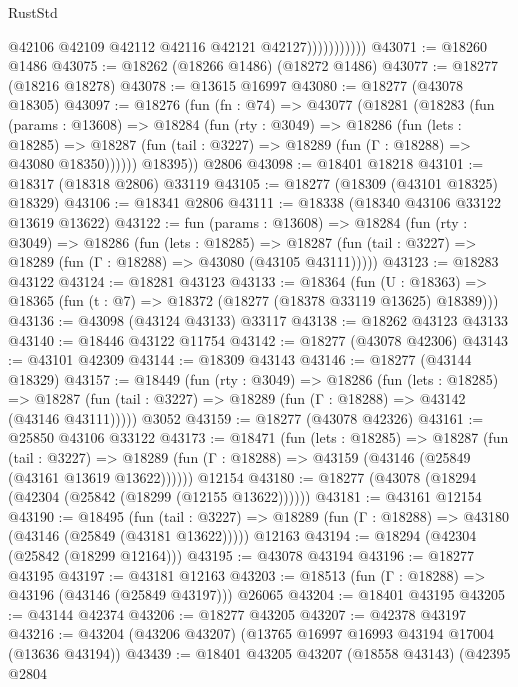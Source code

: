 \begin{lexlean}{RustStd}
\begin{coremodule}
                          @42106
                          @42109
                          @42112
                          @42116
                          @42121
                          @42127)))))))))))
@43071 := @18260 @1486
@43075 := @18262 (@18266 @1486) (@18272 @1486)
@43077 := @18277 (@18216 @18278)
@43078 := @13615 @16997
@43080 := @18277 (@43078 @18305)
@43097 := @18276
    (fun (fn : @74) =>
    @43077
      (@18281
        (@18283
          (fun (params : @13608) =>
          @18284
            (fun (rty : @3049) =>
            @18286
              (fun (lets : @18285) =>
              @18287 (fun (tail : @3227) => @18289 (fun (Γ : @18288) => @43080 @18350))))))
        @18395))
    @2806
@43098 := @18401 @18218
@43101 := @18317 (@18318 @2806) @33119
@43105 := @18277 (@18309 (@43101 @18325) @18329)
@43106 := @18341 @2806
@43111 := @18338 (@18340 @43106 @33122 @13619 @13622)
@43122 := fun (params : @13608) =>
  @18284
    (fun (rty : @3049) =>
    @18286
      (fun (lets : @18285) =>
      @18287 (fun (tail : @3227) => @18289 (fun (Γ : @18288) => @43080 (@43105 @43111)))))
@43123 := @18283 @43122
@43124 := @18281 @43123
@43133 := @18364
    (fun (U : @18363) => @18365 (fun (t : @7) => @18372 (@18277 (@18378 @33119 @13625) @18389)))
@43136 := @43098 (@43124 @43133) @33117
@43138 := @18262 @43123 @43133
@43140 := @18446 @43122 @11754
@43142 := @18277 (@43078 @42306)
@43143 := @43101 @42309
@43144 := @18309 @43143
@43146 := @18277 (@43144 @18329)
@43157 := @18449
    (fun (rty : @3049) =>
    @18286
      (fun (lets : @18285) =>
      @18287 (fun (tail : @3227) => @18289 (fun (Γ : @18288) => @43142 (@43146 @43111)))))
    @3052
@43159 := @18277 (@43078 @42326)
@43161 := @25850 @43106 @33122
@43173 := @18471
    (fun (lets : @18285) =>
    @18287
      (fun (tail : @3227) =>
      @18289 (fun (Γ : @18288) => @43159 (@43146 (@25849 (@43161 @13619 @13622))))))
    @12154
@43180 := @18277 (@43078 (@18294 (@42304 (@25842 (@18299 (@12155 @13622))))))
@43181 := @43161 @12154
@43190 := @18495
    (fun (tail : @3227) => @18289 (fun (Γ : @18288) => @43180 (@43146 (@25849 (@43181 @13622)))))
    @12163
@43194 := @18294 (@42304 (@25842 (@18299 @12164)))
@43195 := @43078 @43194
@43196 := @18277 @43195
@43197 := @43181 @12163
@43203 := @18513 (fun (Γ : @18288) => @43196 (@43146 (@25849 @43197))) @26065
@43204 := @18401 @43195
@43205 := @43144 @42374
@43206 := @18277 @43205
@43207 := @42378 @43197
@43216 := @43204 (@43206 @43207) (@13765 @16997 @16993 @43194 @17004 (@13636 @43194))
@43439 := @18401
    @43205
    @43207
    (@18558 @43143)
    (@42395
      @2804

\end{coremodule}
\end{lexlean}
